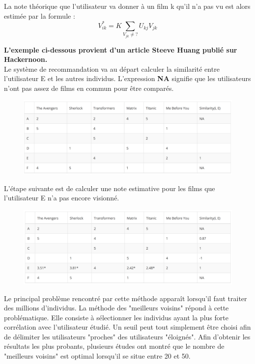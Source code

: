 \documentclass{article}
\begin{document}
La note théorique que l'utilisateur va donner à un film k qu'il n'a pas vu est alors estimée par la formule :
\begin{equation}
    V_{ik}^*=K \sum_{V_{jk}\neq ?} U_{kj} V_{jk}
\end{equation}


\textbf{L'exemple ci-dessous provient d'un article Steeve Huang publié sur Hackernoon.} \\

Le système de recommandation va au départ calculer la similarité entre l'utilisateur E et les autres individus. L'expression \textbf{NA} signifie que les utilisateurs n'ont pas assez de films en commun pour être comparés.


\begin{figure}[h]
    \centering
    \includegraphics[scale=0.17]{Images/tab.png}
\end{figure}

L'étape suivante est de calculer une note estimative pour les films que l'utilisateur E n'a pas encore visionné.

\begin{figure}[h]
    \centering
    \includegraphics[scale=0.29]{Images/tab2.png}
\end{figure}

Le principal problème rencontré par cette méthode apparaît lorsqu'il faut traiter des millions d'individus. La méthode des "meilleurs voisins" répond à cette problématique. Elle consiste à sélectionner les individus ayant la plus forte corrélation avec l'utilisateur étudié. Un seuil peut tout simplement être choisi afin de délimiter les utilisateurs "proches" des utilisateurs "éloignés". Afin d'obtenir les résultats les plus probants, plusieurs études ont montré que le nombre de "meilleurs voisins" est optimal lorsqu'il se situe entre 20 et 50.
\end{document}

